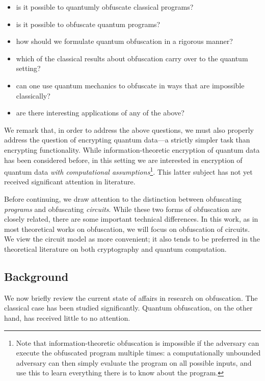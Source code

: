 \documentclass[11pt]{article}
\numberwithin{equation}{section}
\begin{document}
{\begin{itemize}
\item is it possible to quantumly obfuscate classical programs?
\item is it possible to obfuscate quantum programs?
\item how should we formulate quantum obfuscation in a rigorous manner?
\item which of the classical results about obfuscation carry over to the quantum setting?
\item can one use quantum mechanics to obfuscate in ways that are impossible classically?
\item are there interesting applications of any of the above?
\end{itemize}

We remark that, in order to address the above questions, we must also properly address the question of encrypting quantum data---a strictly simpler task than encrypting functionality. While information-theoretic encryption of quantum data has been considered before, in this setting we are interested in encryption of quantum data \emph{with computational assumptions}\footnote{Note that information-theoretic obfuscation is impossible if the adversary can execute the obfuscated program multiple times: a computationally unbounded adversary can then simply evaluate the program on all possible inputs, and use this to learn everything there is to know about the program.}. This latter subject has not yet received significant attention in literature.

Before continuing, we draw attention to the distinction between obfuscating \emph{programs} and obfuscating \emph{circuits}. While these two forms of obfuscation are closely related, there are some important technical differences. In this work, as in most theoretical works on obfuscation, we will focus on obfuscation of circuits. We view the circuit model as more convenient; it also tends to be preferred in the theoretical literature on both cryptography and quantum computation.

\subsection{Background}

We now briefly review the current state of affairs in research on obfuscation. The classical case has been studied significantly. Quantum obfuscation, on the other hand, has received little to no attention.

}
\end{document}
